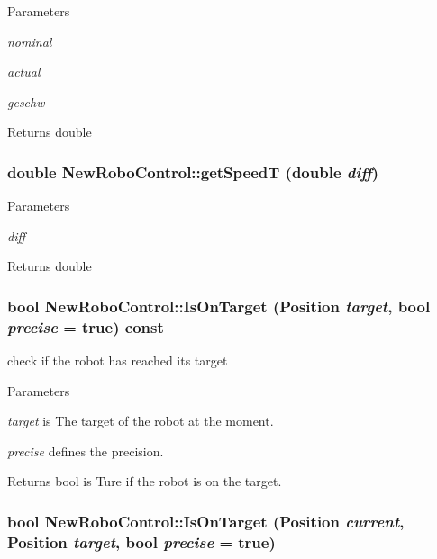 \begin{DoxyParams}{Parameters}
\item[{\em nominal}]\item[{\em actual}]\item[{\em geschw}]\end{DoxyParams}
\begin{DoxyReturn}{Returns}
double 
\end{DoxyReturn}
\hypertarget{classNewRoboControl_a0c5f29bb2dee1faf96725b80ddc64398}{
\subsubsection[{getSpeedT}]{\setlength{\rightskip}{0pt plus 5cm}double NewRoboControl::getSpeedT (double {\em diff})}}
\label{classNewRoboControl_a0c5f29bb2dee1faf96725b80ddc64398}

\begin{DoxyParams}{Parameters}
\item[{\em diff}]\end{DoxyParams}
\begin{DoxyReturn}{Returns}
double 
\end{DoxyReturn}
\hypertarget{classNewRoboControl_a77b0e86bef15f3b1fb6cf98d91c6a9b4}{
\subsubsection[{IsOnTarget}]{\setlength{\rightskip}{0pt plus 5cm}bool NewRoboControl::IsOnTarget (Position {\em target}, \/  bool {\em precise} = {\ttfamily true}) const}}
\label{classNewRoboControl_a77b0e86bef15f3b1fb6cf98d91c6a9b4}


check if the robot has reached its target 


\begin{DoxyParams}{Parameters}
\item[{\em target}]is The target of the robot at the moment. \item[{\em precise}]defines the precision. \end{DoxyParams}
\begin{DoxyReturn}{Returns}
bool is Ture if the robot is on the target. 
\end{DoxyReturn}
\hypertarget{classNewRoboControl_a106c7ccc03f05693a07da1235ab0b17f}{
\subsubsection[{IsOnTarget}]{\setlength{\rightskip}{0pt plus 5cm}bool NewRoboControl::IsOnTarget (Position {\em current}, \/  Position {\em target}, \/  bool {\em precise} = {\ttfamily true})}}
\label{classNewRoboControl_a106c7ccc03f05693a07da1235ab0b17f}


